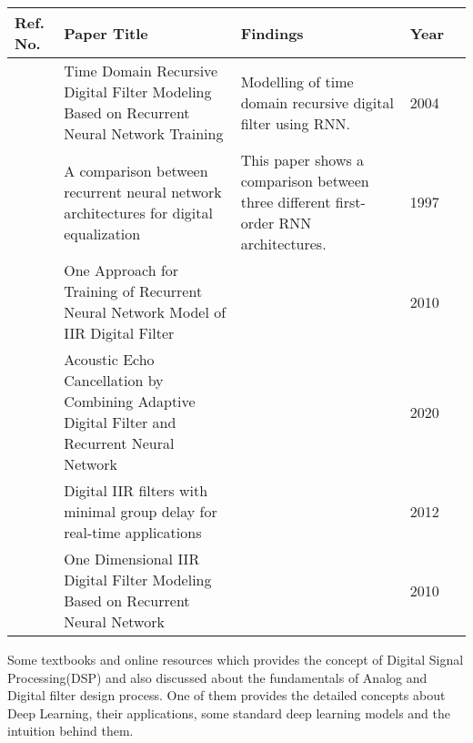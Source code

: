 \vspace{1\baselineskip}
\noindent
\begin{tabularx}{\columnwidth}{|M|M|M|M|M|}
	\hline
	\textbf{Ref. No.} & \textbf{Paper Title} & \textbf{Findings} & \textbf{Year}\\
	\hline
	\cite{stefanova2004time} & Time Domain Recursive Digital Filter Modeling Based on Recurrent Neural Network Training & Modelling of time domain recursive digital filter using RNN. & 2004\\
	\hline
	\cite{595494} & A comparison between recurrent neural network architectures for digital equalization & This paper shows a comparison between three different first-order RNN architectures. & 1997\\
	\hline
	\cite{10.1007/978-90-481-9151-2_38} & One Approach for Training of Recurrent Neural Network Model of IIR Digital Filter &  & 2010\\
	\hline
	\cite{DBLP:journals/corr/abs-2005-09237} & Acoustic Echo Cancellation by Combining Adaptive Digital Filter and Recurrent Neural Network &  & 2020\\
	\hline
	\cite{6396136} & Digital IIR filters with minimal group delay for real-time applications &  & 2012\\
	\hline
	\cite{10.1007/978-90-481-3656-8_52} & One Dimensional IIR Digital Filter Modeling Based on Recurrent Neural Network &  & 2010\\
	\hline
\end{tabularx}
\vspace{1\baselineskip}

Some textbooks and online resources which provides the concept of Digital Signal Processing(DSP) and also discussed about the fundamentals of Analog and Digital filter design process. One of them provides the detailed concepts about Deep Learning, their applications, some standard deep learning models and the intuition behind them\cite{DigitalSignalProcessing}\cite{AnalogandDigitalFilterDesign}\cite{Goodfellow-et-al-2016}.